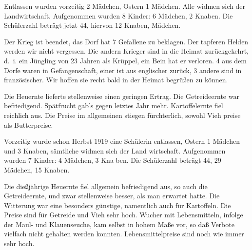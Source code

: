 

\pstart
Entlassen wurden vorzeitig 2 Mädchen, Ostern 1 Mädchen. Alle widmen sich\ob
der Landwirtschaft. Aufgenommen wurden 8 Kinder: 6 Mädchen, 2\ob
Knaben. Die Schülerzahl beträgt jetzt 44, hiervon 12 Knaben, Mädchen.

\pend
{}
\pstart

Der Krieg ist beendet, das Dorf hat 7 Gefallene zu beklagen. Der tapferen\ob
Helden werden wir nicht vergessen. Die andern Krieger sind in die Heimat\ob
zurückgekehrt, d.\ i. ein Jüngling von 23 Jahren als Krüppel, ein Bein hat er\ob
verloren. 4 aus dem Dorfe waren in Gefangenschaft, einer ist aus englischer\ob
zurück, 3 andere sind in französischer. Wir hoffen sie recht bald in der\ob
Heimat begrüßen zu können.

\pend
{}
\pstart

Die Heuernte lieferte stellenweise einen geringen Ertrag. Die Getreideernte\ob
war befriedigend. Spätfrucht gab's gegen letztes Jahr mehr. Kartoffelernte fiel\ob
reichlich aus. Die Preise im allgemeinen stiegen fürchterlich, sowohl Vieh\ohb
preise als Butterpreise.

\pend
{}
\pstart

Vorzeitig wurde schon Herbst 1919 eine Schülerin entlassen, Ostern 1 Mädchen und 3 Knaben, sämtliche widmen sich der Land\ohb
wirtschaft. Aufgenommen wurden 7 Kinder: 4 Mädchen, 3 Kna\ohb
ben. Die Schülerzahl beträgt 44, 29 Mädchen, 15 Knaben.

\pend
{}
\pstart

Die dießjährige Heuernte fiel allgemein befriedigend aus, so auch die\ob
Getreideernte, und zwar stellenweise besser, als man erwartet hatte. Die\ob
Witterung war eine besonders günstige, namentlich auch für Kartoffeln.\ob
Die Preise sind für Getreide und Vieh sehr hoch. Wucher mit Lebensmitteln,\ob
infolge der Maul- und Klauenseuche, kam selbst in hohem Maße vor, so daß\ob
Verbote vielfach nicht gehalten werden konnten. Lebensmittelpreise sind noch\ob
wie immer sehr hoch.

\pend
{}
\pstart

\pend
